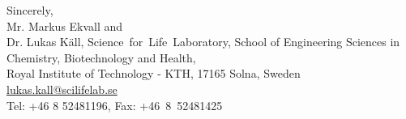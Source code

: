 \documentclass[a4paper]{letter}
\begin{document}
\begin{letter}{}
\begin{itemize}
\end{itemize}

\vspace*{1.5em}

Sincerely,\\[2em]
Mr. Markus Ekvall and\\
Dr. Lukas K\"all, Science~for~Life~Laboratory, School of
Engineering Sciences in Chemistry, Biotechnology and Health,\\
Royal Institute of Technology - KTH, 17165 Solna, Sweden\\
\url{lukas.kall@scilifelab.se}\\
Tel: +46 8 52481196, Fax: +46~8~52481425

\end{letter}
\end{document}
